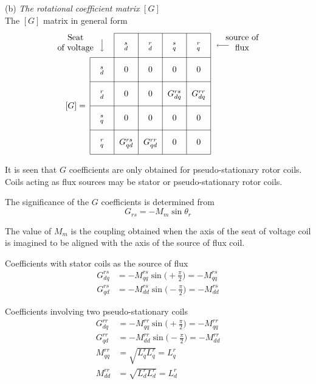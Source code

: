 \documentclass[a4paper,numbers=noenddot,12pt]{scrbook}
\begin{document}
\noindent (b) \emph{The rotational coefficient matrix} $[G]$\\
The $[G]$ matrix in general form
\begin{equation}
    \begin{tikzpicture} [anchor = base, baseline =0pt]
        \draw (0,0)--(5,0) (0,1)--(5,1) (0,2)--(5,2) (1,3)--(5,3) (0,-1)--(5,-1) (0,-2)--(5,-2);
        \draw (0,-2)--(0,2) (1,-2)--(1,3) (2,-2)--(2,3) (3,-2)--(3,3) (4,-2)--(4,3) (5,-2)--(5,3);
        \draw (0.5,-1.6) node{$_q^r$} +(0,1) node{$_q^s$} +(0,2) node{$_d^r$} +(0,3) node{$_d^s$};
        \draw (1.5,-1.6) node{$G_{qd}^{rs}$} +(0,1) node{0} +(0,2) node{0} +(0,3) node{0}+(0,4) node{$_d^s$};
        \draw (2.5,-1.6) node{$G_{qd}^{rr}$} +(0,1) node{0} +(0,2) node{0} +(0,3) node{0}+(0,4) node{$_d^r$};
        \draw (3.5,-1.6) node{0} +(0,1) node{0} +(0,2) node{$G_{dq}^{rs}$} +(0,3) node{0}+(0,4) node{$_q^s$};
        \draw (4.5,-1.6) node{0} +(0,1) node{0} +(0,2) node{$G_{dq}^{rr}$} +(0,3) node{0}+(0,4) node{$_q^r$};
        \draw (-0.6,-0.1) node{$[G] =$};
        \draw [align = center,->](-0.6, 2.3) node{Seat\\of voltage} (0.5,2.75)--(0.5, 2.25);
        \draw [align = center,->](6.3, 2.3) node{source of\\flux} (5.75,2.5)--(5.25,2.5);
    \end{tikzpicture}
\end{equation}

It is seen that $G$ coefficients are only obtained for pseudo-stationary rotor coils. Coils acting as flux sources may be stator or pseudo-stationary rotor coils.

The significance of the $G$ coefficients is determined from
\begin{equation*}
    G_{rs} = -M_m \sin \theta_r
\end{equation*}

The value of $M_m$ is the coupling obtained when the axis of the seat of voltage coil is imagined to be aligned with the axis of the source of flux coil.

Coefficients with stator coils as the source of flux
\begin{align*}
    G_{dq}^{rs} &= - M_{qq}^{rs} \sin \Big (+\frac{\pi}{2}\Big) = -M_{qq}^{rs}\\
    G_{qd}^{rs} &= - M_{dd}^{rs} \sin \Big (-\frac{\pi}{2}\Big) = -M_{dd}^{rs}
\end{align*}

Coefficients involving two pseudo-stationary coils 
\begin{align*}
    G_{dq}^{rr} & =-M_{qq}^{rr} \sin \Big( +\frac{\pi}{2} \Big) = -M_{qq}^{rr}\\
    G_{qd}^{rr} & =-M_{dd}^{rr} \sin \Big( -\frac{\pi}{2} \Big) = -M_{dd}^{rr}\\
    M_{qq}^{rr} & = \sqrt{L_q^r L_q^r} = L_q^r \\
    M_{dd}^{rr} & = \sqrt{L_d^r L_d^r} = L_d^r
\end{align*}
\end{document}

